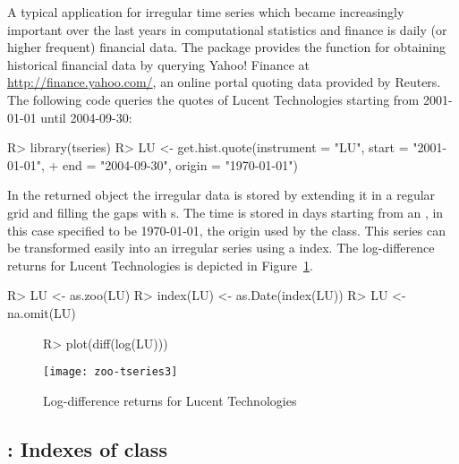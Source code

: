 \documentclass{Z}
\begin{document}
A typical application for irregular time series which became increasingly
important over the last years in computational statistics and finance is
daily (or higher frequent) financial data. The package  provides
the function  for obtaining historical financial data
by querying Yahoo! Finance at \url{http://finance.yahoo.com/},
an online portal quoting data provided by Reuters. The following code
queries the quotes of Lucent Technologies starting from 2001-01-01
until 2004-09-30:

\begin{Schunk}
\begin{Sinput}
R> library(tseries)
R> LU <- get.hist.quote(instrument = "LU", start = "2001-01-01", 
+     end = "2004-09-30", origin = "1970-01-01")
\end{Sinput}
\end{Schunk}


In the returned  object the irregular data is stored by extending
it in a regular grid and filling the gaps with s. The time is stored
in days starting from an , in this case specified to be 1970-01-01, the
origin used by the  class.
This series can be transformed easily into an irregular  series 
using a  index. The log-difference returns for Lucent 
Technologies is depicted in Figure~\ref{fig:tseries}.

\begin{Schunk}
\begin{Sinput}
R> LU <- as.zoo(LU)
R> index(LU) <- as.Date(index(LU))
R> LU <- na.omit(LU)
\end{Sinput}
\end{Schunk}

\begin{figure}[h!]
\begin{center}
\begin{Schunk}
\begin{Sinput}
R> plot(diff(log(LU)))
\end{Sinput}
\end{Schunk}
\texttt{[image: zoo-tseries3]}
\caption{\label{fig:tseries} Log-difference returns for Lucent Technologies}
\end{center}
\end{figure}


\subsection[fCalendar: Indexes of class "timeDate"]{: Indexes of class }
\label{sec:fCalendar}
\end{document}
